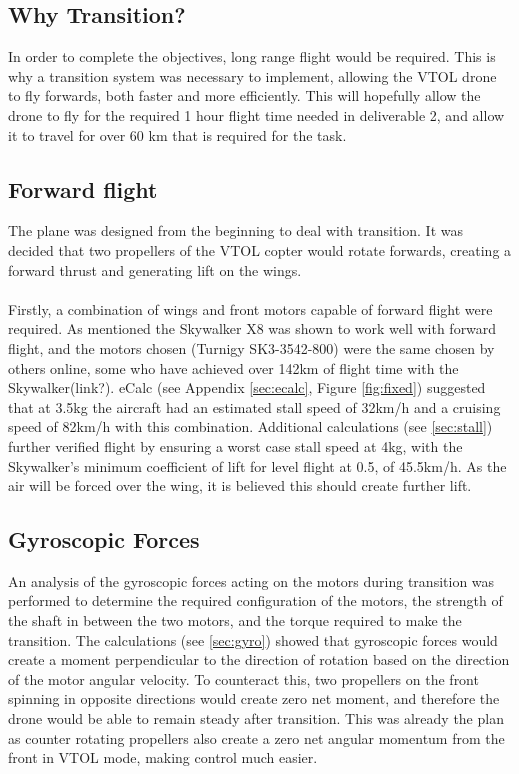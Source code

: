 

\subsection{Why Transition?}
In order to complete the objectives, long range flight would be required. This is why a transition system was necessary to implement, allowing the VTOL drone to fly forwards, both faster and more efficiently. This will hopefully allow the drone to fly for the required 1 hour flight time needed in deliverable 2, and allow it to travel for over 60 km that is required for the task. 

\subsection{Forward flight}
The plane was designed from the beginning to deal with transition. It was decided that two propellers of the VTOL copter would rotate forwards, creating a forward thrust and generating lift on the wings.  
\\\\
Firstly, a combination of wings and front motors capable of forward flight were required.  As mentioned the Skywalker X8 was shown to work well with forward flight, and the motors chosen (Turnigy SK3-3542-800) were the same chosen by others online, some who have achieved over 142km of flight time with the Skywalker(link?). eCalc (see Appendix \ref{sec:ecalc}, Figure \ref{fig:fixed}) suggested that at 3.5kg the aircraft had an estimated stall speed of 32km/h and a cruising speed of 82km/h with this combination. Additional calculations (see \ref{sec:stall}) further verified flight by ensuring a worst case stall speed at 4kg, with the Skywalker's minimum coefficient of lift for level flight at 0.5, of 45.5km/h. As the air will be forced over the wing, it is believed this should create further lift.

\subsection{Gyroscopic Forces}
An analysis of the gyroscopic forces acting on the motors during transition was performed to determine the required configuration of the motors, the strength of the shaft in between the two motors, and the torque required to make the transition. The calculations (see  \ref{sec:gyro}) showed that gyroscopic forces would create a moment perpendicular to the direction of rotation based on the direction of the motor angular velocity. To counteract this, two propellers on the front spinning in opposite directions would create zero net moment, and therefore the drone would be able to remain steady after transition. This was already the plan as counter rotating propellers also create a zero net angular momentum from the front in VTOL mode, making control much easier.\\

